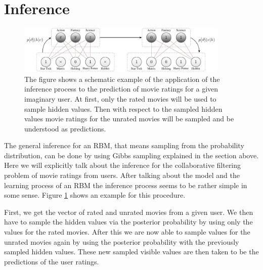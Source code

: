 \documentclass[crop=false,10pt]{standalone}
\begin{document}
  \section{Inference} %
  \label{sec:Inference}
    \begin{figure}
      \center
      \includegraphics[width=0.9\textwidth]{figures/rbm-inference-example.pdf}
      \caption{%
        The figure shows a schematic example of the application of the inference process to the prediction of movie ratings for a given imaginary user.
        At first, only the rated movies will be used to sample hidden values.
        Then with respect to the sampled hidden values movie ratings for the unrated movies will be sampled and be understood as predictions.
      }
      \label{fig:rbm-inference-example}
    \end{figure}

    The general inference for an RBM, that means sampling from the probability distribution, can be done by using Gibbs sampling explained in the section above.
    Here we will explicitly talk about the inference for the collaborative filtering problem of movie ratings from users.
    After talking about the model and the learning process of an RBM the inference process seems to be rather simple in some sense.
    Figure \ref{fig:rbm-inference-example} shows an example for this procedure.

    First, we get the vector of rated and unrated movies from a given user.
    We then have to sample the hidden values via the posterior probability by using only the values for the rated movies.
    After this we are now able to sample values for the unrated movies again by using the posterior probability with the previously sampled hidden values.
    These new sampled visible values are then taken to be the predictions of the user ratings.
\end{document}
